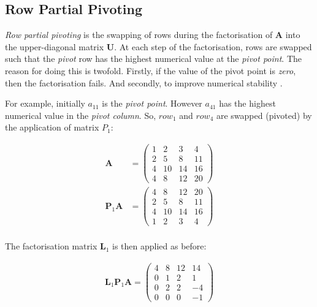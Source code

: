 %
%
\subsection{Row Partial Pivoting}

\emph{Row partial pivoting} is the swapping of rows during the factorisation of $\mathbf{A}$ into the upper-diagonal matrix $\mathbf{U}$. At each step of the factorisation, rows are swapped such that the \emph{pivot} row has the highest numerical value at the \emph{pivot point}. The reason for doing this is twofold. Firstly, if the value of the pivot point is \emph{zero}, then the factorisation fails. And secondly, to improve numerical stability \cite{numerical-linear-algebra}.

For example, initially $a_{11}$ is the \emph{pivot point}. However $a_{41}$ has the highest numerical value in the \emph{pivot column}. So, $row_1$ and $row_4$ are swapped (pivoted) by the application of matrix $P_1$:

\begin{equation}
\begin{split}
\mathbf{A} &=
\begin{pmatrix}
1 & 2 & 3 & 4 \\
2 & 5 & 8 & 11 \\
4 & 10 & 14 & 16 \\
4 & 8 & 12 & 20 
\end{pmatrix} \\
\mathbf{P}_1\mathbf{A} &=
\begin{pmatrix}
4 & 8 & 12 & 20 \\
2 & 5 &  8 & 11 \\
4 & 10 & 14 & 16 \\
1 & 2 & 3 & 4
\end{pmatrix} \\
\end{split}
\end{equation}

The factorisation matrix $\mathbf{L}_1$ is then applied as before:
 
\begin{equation}
\begin{split}
\mathbf{L}_1\mathbf{P}_1\mathbf{A} =
\begin{pmatrix}
4 & 8 & 12 & 14 \\
0 & 1 & 2 & 1 \\
0 & 2 & 2 & -4 \\
0 & 0 & 0 & -1
\end{pmatrix} \\
\end{split}
\end{equation}

